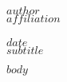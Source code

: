 \documentclass[letterpaper,$fontsize$,$sides$]{article}
\begin{document}
\thispagestyle{empty}


\begin{flushleft}
\rmfamily\normalsize{$author$} \\
\normalsize{$affiliation$} \\
\normalsize{} \\
\rmfamily\normalsize{$date$} \\ 
\vspace{1.5em}
\rmfamily\bfseries\Large{$subtitle$}
\end{flushleft}
\RaggedRight
$body$
\end{document}
